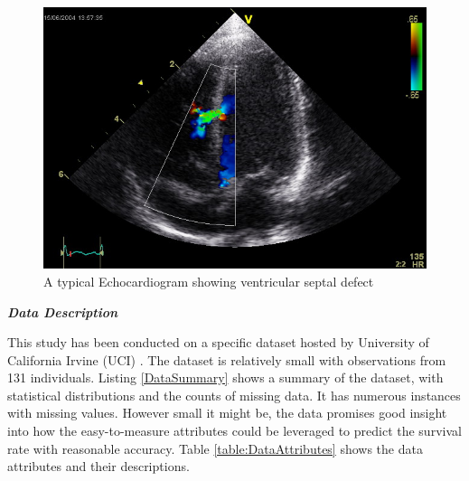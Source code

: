 \documentclass[11pt]{article}
\begin{document}
\begin{figure}[htbp]
\centering
\includegraphics[scale=0.5]{Ventricular_Septal_Defect.jpg}
\caption{A typical Echocardiogram showing ventricular septal defect \cite{echo}}
\label{fig:SampleEchocardiogram}
\end{figure}

{\textbf {\emph{Data Description}}}

This study has been conducted on a specific dataset hosted by University of California Irvine (UCI) \cite{data}. The dataset is relatively small with observations from 131 individuals. Listing \ref{DataSummary} shows a summary of the dataset, with statistical distributions and the counts of missing data. It has numerous instances with missing values. However small it might be, the data promises good insight into how the easy-to-measure attributes could be leveraged to predict the survival rate with reasonable accuracy. Table \ref{table:DataAttributes} shows the data attributes and their descriptions.

\end{document}
